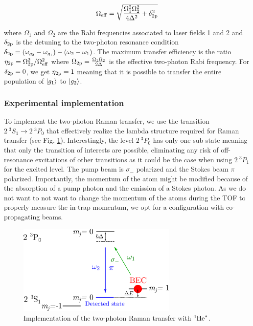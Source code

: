 \begin{equation}
    \Omega_{\rm{eff}}= \sqrt{\frac{\Omega_1^2 \Omega_2^2}{4 \Delta^2} + \delta_{\rm{2p}}^2}
\end{equation}

\noindent where $\Omega_1$ and $\Omega_2$ are the Rabi frequencies associated to laser fields 1 and 2 and $\delta_{\rm{2p}}$ is the detuning to the two-photon resonance condition $\delta_{\rm{2p}}=(\omega_{g_2} - \omega_{g_1}) - (\omega_2-\omega_1)$. The maximum transfer efficiency is the ratio $\eta_{\rm{2p}}=\Omega_{\rm{2p}}^2 /\Omega^2_{\rm{eff}}$ where $\Omega_{\rm{2p}}=\frac{\Omega_1 \Omega_2}{2 \Delta}$ is the effective two-photon Rabi frequency. For $\delta_{\rm{2p}}=0$, we get $\eta_{\rm{2p}}=1$ meaning that it is possible to transfer the entire population of $\ket{g_1}$ to $\ket{g_2}$.



\subsubsection{Experimental implementation}

To implement the two-photon Raman transfer, we use the transition $2 \ ^3 S_1 \rightarrow 2 \ ^3 P_0$ that effectively realize the lambda structure required for Raman transfer (see Fig.-\ref{fig:raman_He}). Interestingly, the level $2 \ ^3 P_0$ has only one sub-state meaning that only the transition of interests are possible, eliminating any risk of off-resonance excitations of other transitions as it could be the case when using $2 \ ^3 P_1$ for the excited level. The pump beam is $\sigma_-$ polarized and the Stokes beam $\pi$ polarized. Importantly, the momentum of the atom might be modified because of the absorption of a pump photon and the emission of a Stokes photon. As we do not want to not want to change the momentum of the atoms during the TOF to properly measure the in-trap momentum, we opt for a configuration with co-propagating beams.

\begin{figure}
    \centering
    \includegraphics[width=0.7\textwidth]{Fig/Chapter3/raman_exp.png}
    \caption{Implementation of the two-photon Raman transfer with $^4 \rm{He}^*$.}
    \label{fig:raman_He}
\end{figure}

